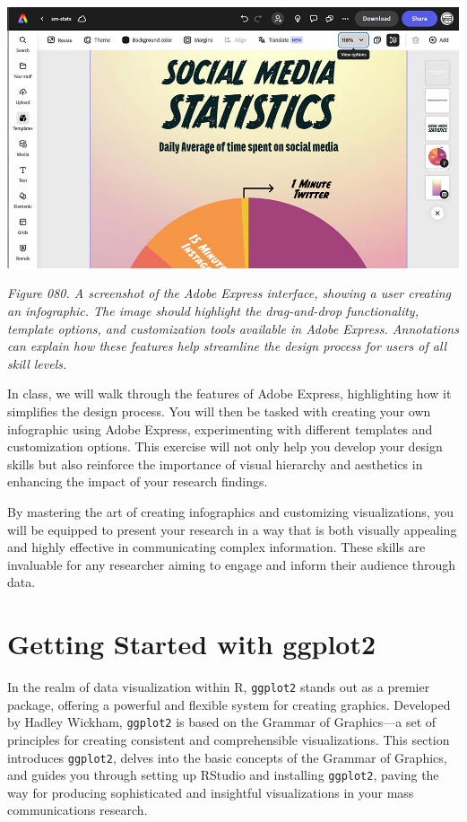 \documentclass[
]{book}
\begin{document}
\includegraphics[width=1\linewidth,height=\textheight,keepaspectratio]{images/fig080.jpg}

\emph{Figure 080. A screenshot of the Adobe Express interface, showing a user creating an infographic. The image should highlight the drag-and-drop functionality, template options, and customization tools available in Adobe Express. Annotations can explain how these features help streamline the design process for users of all skill levels.}

In class, we will walk through the features of Adobe Express, highlighting how it simplifies the design process. You will then be tasked with creating your own infographic using Adobe Express, experimenting with different templates and customization options. This exercise will not only help you develop your design skills but also reinforce the importance of visual hierarchy and aesthetics in enhancing the impact of your research findings.

By mastering the art of creating infographics and customizing visualizations, you will be equipped to present your research in a way that is both visually appealing and highly effective in communicating complex information. These skills are invaluable for any researcher aiming to engage and inform their audience through data.

\section{Getting Started with ggplot2}\label{getting-started-with-ggplot2}

In the realm of data visualization within R, \texttt{ggplot2} stands out as a premier package, offering a powerful and flexible system for creating graphics. Developed by Hadley Wickham, \texttt{ggplot2} is based on the Grammar of Graphics---a set of principles for creating consistent and comprehensible visualizations. This section introduces \texttt{ggplot2}, delves into the basic concepts of the Grammar of Graphics, and guides you through setting up RStudio and installing \texttt{ggplot2}, paving the way for producing sophisticated and insightful visualizations in your mass communications research.
\end{document}
